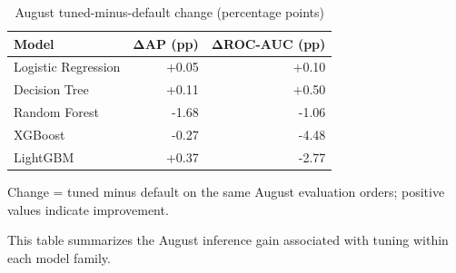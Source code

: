 \begin{table}[htbp]
\centering
\small
\caption{August tuned-minus-default change (percentage points)}
\begin{tabular}{lrr}
\toprule
Model & ΔAP (pp) & ΔROC-AUC (pp) \\
\midrule
Logistic Regression & +0.05 & +0.10 \\
Decision Tree & +0.11 & +0.50 \\
Random Forest & -1.68 & -1.06 \\
XGBoost & -0.27 & -4.48 \\
LightGBM & +0.37 & -2.77 \\
\bottomrule
\end{tabular}
\par\smallskip\begin{minipage}{\linewidth}\footnotesize Change = tuned minus default on the same August evaluation orders; positive values indicate improvement.\end{minipage}
\end{table}
This table summarizes the August inference gain associated with tuning within each model family.
